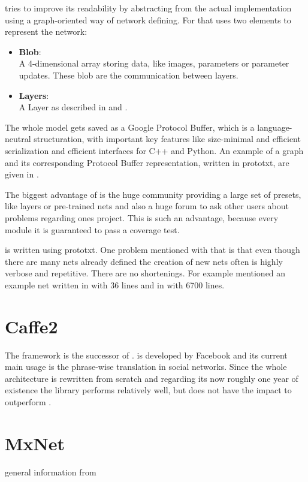 \caffe tries to improve its readability by abstracting from the actual implementation using a graph-oriented way of network defining. For that \caffe uses two elements to represent the network:
\begin{itemize}
	\item \textbf{Blob}:\\
		A 4-dimensional array storing data, like images, parameters or parameter updates. These blob are the communication between layers.
	\item \textbf{Layers}:\\
		A Layer as described in  and .
\end{itemize}
The whole model gets saved as a Google Protocol Buffer, which is a language-neutral structuration, with important key features like size-minimal and efficient serialization and efficient interfaces for C++ and Python. \cite{jia2014caffe} \cite{varda2008protocol}
An example of a graph and its corresponding Protocol Buffer representation, written in prototxt, are given in .



The biggest advantage of \caffe is the huge community providing a large set of presets, like layers or pre-trained nets and also a huge forum to ask other users about problems regarding ones project. This is such an advantage, because every module it is  guaranteed to pass a coverage test. \cite{jia2014caffe}

\caffe is written using prototxt. One problem mentioned with that is that even though there are many nets already defined the creation of new nets often is highly verbose and repetitive. There are no shortenings. For example \cite{tim2018CNNArchLang} mentioned an example net written in \cnnarch with 36 lines and in \caffe with 6700 lines.

\section{Caffe2} \label{sec: Caffe2}
The framework \caffetwo is the successor of \caffe. \caffetwo is developed by Facebook and its current main usage is the phrase-wise translation in social networks. Since the whole architecture is rewritten from scratch and regarding its now roughly one year of existence the library performs relatively well, but does not have the impact to outperform \caffe \cite{heise:Caffe2}.

\section{MxNet}\label{subsec: MxNet}

general information from \cite{chen2015mxnet}

